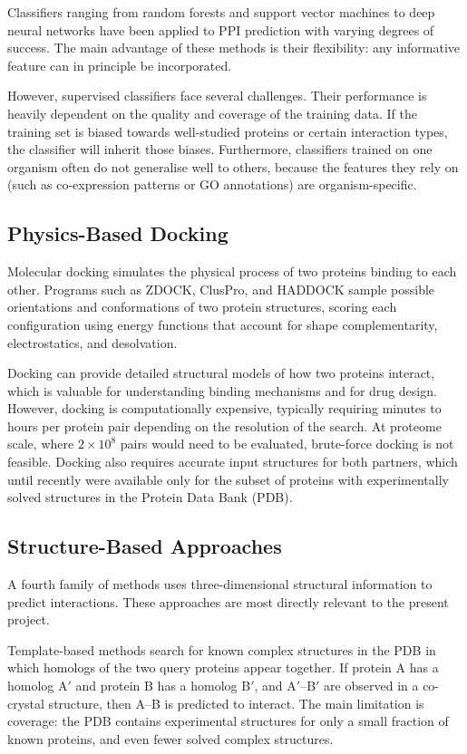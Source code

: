 Classifiers ranging from random forests and support vector machines to deep neural networks have been applied to PPI prediction with varying degrees of success.
The main advantage of these methods is their flexibility: any informative feature can in principle be incorporated.

However, supervised classifiers face several challenges.
Their performance is heavily dependent on the quality and coverage of the training data.
If the training set is biased towards well-studied proteins or certain interaction types, the classifier will inherit those biases.
Furthermore, classifiers trained on one organism often do not generalise well to others, because the features they rely on (such as co-expression patterns or GO annotations) are organism-specific.

\subsection{Physics-Based Docking}

Molecular docking simulates the physical process of two proteins binding to each other.
Programs such as ZDOCK, ClusPro, and HADDOCK sample possible orientations and conformations of two protein structures, scoring each configuration using energy functions that account for shape complementarity, electrostatics, and desolvation.

Docking can provide detailed structural models of how two proteins interact, which is valuable for understanding binding mechanisms and for drug design.
However, docking is computationally expensive, typically requiring minutes to hours per protein pair depending on the resolution of the search.
At proteome scale, where $2 \times 10^{8}$ pairs would need to be evaluated, brute-force docking is not feasible.
Docking also requires accurate input structures for both partners, which until recently were available only for the subset of proteins with experimentally solved structures in the Protein Data Bank (PDB).

\subsection{Structure-Based Approaches}

A fourth family of methods uses three-dimensional structural information to predict interactions.
These approaches are most directly relevant to the present project.

Template-based methods search for known complex structures in the PDB in which homologs of the two query proteins appear together.
If protein A has a homolog A$'$ and protein B has a homolog B$'$, and A$'$--B$'$ are observed in a co-crystal structure, then A--B is predicted to interact.
The main limitation is coverage: the PDB contains experimental structures for only a small fraction of known proteins, and even fewer solved complex structures.


